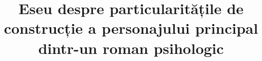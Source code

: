 

\title{Eseu despre particularitățile de construcție a personajului principal dintr-un roman psihologic}


 \maketitle %
 

